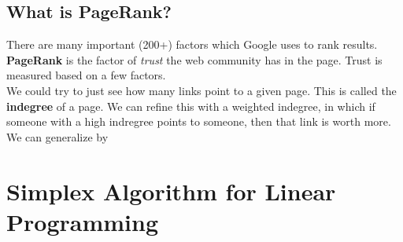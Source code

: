 \documentclass[12pt]{article}
\theoremstyle{definition}
\begin{document}
\subsection{What is PageRank?}
There are many important (200+) factors which Google uses to rank results. \textbf{PageRank} is the factor of \textit{trust} the web community has in the page. Trust is measured based on a few factors. 
\\ \linebreak
We could try to just see how many links point to a given page. This is called the \textbf{indegree} of a page. We can refine this with a weighted indegree, in which if someone with a high indregree points to someone, then that link is worth more. We can generalize by 

\section{Simplex Algorithm for Linear Programming}
\end{document}
